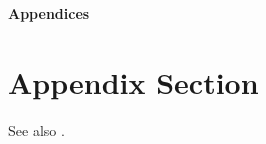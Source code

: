 \begin{center}{\Large\textbf{Appendices}}\end{center}
\section{Appendix Section}

\lipsum[1-2] See also \citet{persson2002political}.

\newpage
\printbibliography[title=Appendix References,heading=subbibintoc,filter=appendixOnlyFilter]
